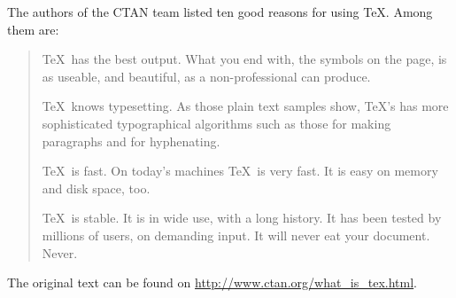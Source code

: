 \documentclass{article}
\begin{document}
The authors of the CTAN team listed ten good reasons
for using \TeX. Among them are:
\begin{quotation}
    \TeX\ has the best output. What you end with,
    the symbols on the page, is as useable, and beautiful,
    as a non-professional can produce.

    \TeX\ knows typesetting. As those plain text samples
    show, \TeX's has more sophisticated typographical algorithms
    such as those for making paragraphs and for hyphenating.

    \TeX\ is fast. On today's machines \TeX\ is very fast.
    It is easy on memory and disk space, too. 

    \TeX\ is stable. It is in wide use, with a long history.
    It has been tested by millions of users, on demanding input.
    It will never eat your document. Never.
\end{quotation}
The original text can be found on
\url{ http://www.ctan.org/what_is_tex.html}.
\end{document}
